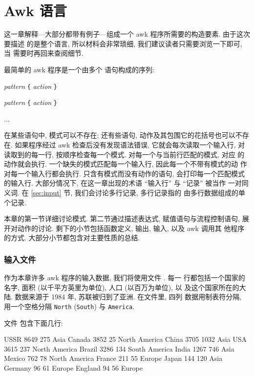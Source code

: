 
\chapter{Awk 语言}
\label{chap:the_awk_language}

这一章解释---大部分都带有例子---组成一个 awk 程序所需要的构造要素.
由于这次要描述
的是整个语言, 所以材料会非常琐细, 我们建议读者只需要浏览一下即可, 当
需要时再回来查阅细节.

最简单的 awk 程序是一个由多个 \patact 语句构成的序列:
\begin{pattern}
\textit{pattern} \texttt{\{} \textit{action} \texttt{\}} \par
\textit{pattern} \texttt{\{} \textit{action} \texttt{\}} \par
...
\end{pattern}
在某些语句中, 模式可以不存在; 还有些语句, 动作及其包围它的花括号也可以不存
在. 如果程序经过 awk 检查后没有发现语法错误, 它就会每次读取一个输入行,
对读取到的每一行, 按顺序检查每一个模式. 对每一个与当前行匹配的模式, 对应
的动作就会执行. 一个缺失的模式匹配每一个输入行, 因此每一个不带有模式的动
作对每一个输入行都会执行. 只含有模式而没有动作的语句, 会打印每一个匹配模式
的输入行. 大部分情况下, 在这一章出现的术语 ``输入行'' 与 ``记录'' 被当作
一对同义词. 在 \ref{sec:input} 节, 我们会讨论多行记录, 多行记录指的
由多行数据组成的单个记录.

本章的第一节详细讨论模式. 第二节通过描述表达式, 赋值语句与流程控制语句,
展开对动作的讨论. 剩下的小节包括函数定义, 输出, 输入, 以及 awk 调用其
他程序的方式. 大部分小节都包含对主要性质的总结.

\subsection*{输入文件\textbf{}}
\label{subsec:the_input_file_countries}

作为本章许多 awk 程序的输入数据, 我们将使用文件 . 每一
行都包括一个国家的名字, 面积 (以千平方英里为单位), 人口 (以百万为单位), 以
及这个国家所在的大陆. 数据来源于 1984 年, 苏联被归到了亚洲. 在文件里, 四列
数据用制表符分隔, 用一个空格分隔 \texttt{North} (\texttt{South}) 与
\texttt{America}.

文件  包含下面几行:
\begin{myverb}
    USSR        8649    275     Asia
    Canada      3852    25      North America
    China       3705    1032    Asia
    USA         3615    237     North America
    Brazil      3286    134     South America
    India       1267    746     Asia
    Mexico      762     78      North America
    France      211     55      Europe
    Japan       144     120     Asia
    Germany     96      61      Europe
    England     94      56      Europe
\end{myverb}

